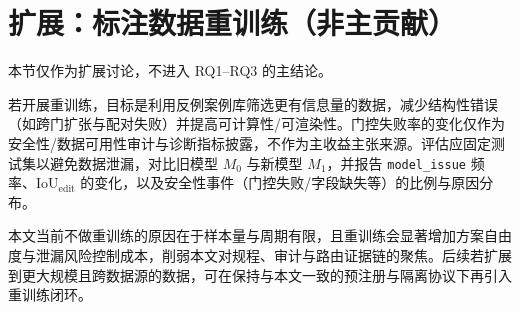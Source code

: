 ﻿\section{扩展：标注数据重训练（非主贡献）}

本节仅作为扩展讨论，不进入 RQ1--RQ3 的主结论。

若开展重训练，目标是利用反例案例库筛选更有信息量的数据，减少结构性错误（如跨门扩张与配对失败）并提高可计算性/可渲染性。门控失败率的变化仅作为安全性/数据可用性审计与诊断指标披露，不作为主收益主张来源。评估应固定测试集以避免数据泄漏，对比旧模型 $M_0$ 与新模型 $M_1$，并报告 \texttt{model\_issue} 频率、$\mathrm{IoU}_{\mathrm{edit}}$ 的变化，以及安全性事件（门控失败/字段缺失等）的比例与原因分布。

本文当前不做重训练的原因在于样本量与周期有限，且重训练会显著增加方案自由度与泄漏风险控制成本，削弱本文对规程、审计与路由证据链的聚焦。后续若扩展到更大规模且跨数据源的数据，可在保持与本文一致的预注册与隔离协议下再引入重训练闭环。


